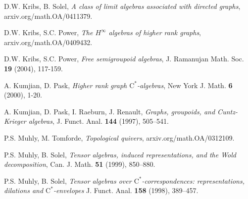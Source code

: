 \documentclass[12pt]{amsart}
\theoremstyle{plain}
\theoremstyle{definition}
\newcommand{\ca}{\mathrm{C}^*}
\newcommand{\bbZ}{{\mathbb{Z}}}
\renewcommand{\O}{{\mathcal{O}}}
\begin{document}
\begin{thebibliography}{99}
 D.W. Kribs, B. Solel,
\textit{A class of limit algebras associated with directed
graphs}, arxiv.org/math.OA/0411379.

 D.W. Kribs, S.C. Power,
\textit{The $H^\infty$ algebras of higher rank graphs},
arxiv.org/math.OA/0409432.

 D.W. Kribs, S.C. Power,
\textit{Free semigroupoid algebras}, J. Ramanujan Math. Soc. {\bf
19} (2004), 117-159.




  A. Kumjian, D. Pask,
\textit{Higher rank graph $\ca$-algebras}, New York J. Math.
\textbf{6} (2000), 1-20.

  A. Kumjian, D. Pask, I. Raeburn, J. Renault,
\textit{Graphs, groupoids, and Cuntz-Krieger algebras}, J. Funct.
Anal. \textbf{144} (1997), 505--541.






 P.S. Muhly, M. Tomforde, \textit{Topological
quivers}, arxiv.org/math.OA/0312109.

 P.S. Muhly, B. Solel,
\textit{Tensor algebras, induced representations, and the Wold
decomposition}, Can. J. Math. {\bf 51} (1999), 850--880.

 P.S. Muhly, B. Solel,
\textit{Tensor algebras over $\ca$-correspondences:
representations, dilations and $\ca$-envelopes} J. Funct. Anal.
\textbf{158} (1998), 389--457.



\end{thebibliography}
\end{document}
